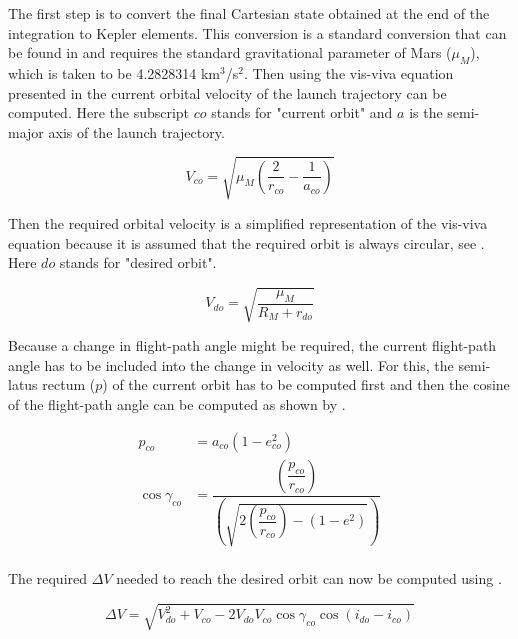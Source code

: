\noindent
The first step is to convert the final Cartesian state obtained at the end of the integration to Kepler elements. This conversion is a standard conversion that can be found in \cite{wakker2010} and requires the standard gravitational parameter of Mars ($\mu_{M}$), which is taken to be 4.2828314 km$^{3}$/s$^{2}$. Then using the vis-viva equation presented in  the current orbital velocity of the launch trajectory can be computed. Here the subscript $co$ stands for "current orbit" and $a$ is the semi-major axis of the launch trajectory.

\begin{equation} \label{eq:visViva}
V_{co} = \sqrt{\mu_{M}\left(\dfrac{2}{r_{co}}-\dfrac{1}{a_{co}}\right)}
\end{equation}


\noindent
Then the required orbital velocity is a simplified representation of the vis-viva equation because it is assumed that the required orbit is always circular, see . Here $do$ stands for "desired orbit".

\begin{equation} \label{eq:simpVisViva}
V_{do}=\sqrt{\dfrac{\mu_{M}}{R_{M}+r_{do}}}
\end{equation} 

\noindent
Because a change in flight-path angle might be required, the current flight-path angle has to be included into the change in velocity as well. For this, the semi-latus rectum ($p$) of the current orbit has to be computed first and then the cosine of the flight-path angle can be computed as shown by .


\begin{equation}\label{eq:cosFPA}
\begin{split}
p_{co}&=a_{co}\left(1-e_{co}^{2}\right)\\
\cos \gamma_{co}&=\dfrac{\left(\dfrac{p_{co}}{r_{co}}\right)}{\left(\sqrt{2\left(\dfrac{p_{co}}{r_{co}}\right)-\left(1-e^{2}\right)}\right)}\\
\end{split}
\end{equation}

\noindent
The required $\Delta V$ needed to reach the desired orbit can now be computed using .

\begin{equation} \label{eq:requiredDeltaV}
\Delta V = \sqrt{V_{do}^{2}+V_{co}-2V_{do}V_{co}\cos \gamma_{co}\cos\left(i_{do}-i_{co}\right)}
\end{equation}

